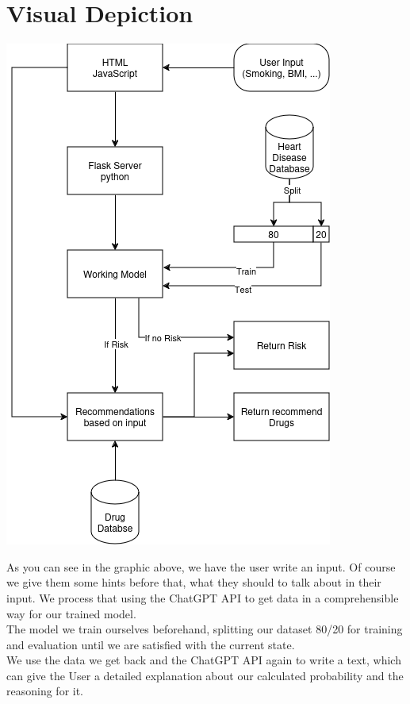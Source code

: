 \documentclass{article}
\begin{document}
   


\section{Visual Depiction}
\begin{center} 
\includegraphics[scale=.75]{Hearth_death.drawio(1).png}
\end{center}
As you can see in the graphic above, we have the user write an input. Of course we give them some hints before that, what they should to talk about in their input. We process that using the ChatGPT API to get data in a comprehensible way for our trained model.
\\
The model we train ourselves beforehand, splitting our dataset 80/20 for training and evaluation until we are satisfied with the current state.
\\
We use the data we get back and the ChatGPT API again to write a text, which can give the User a detailed explanation about our calculated probability and the reasoning for it.
\end{document}
